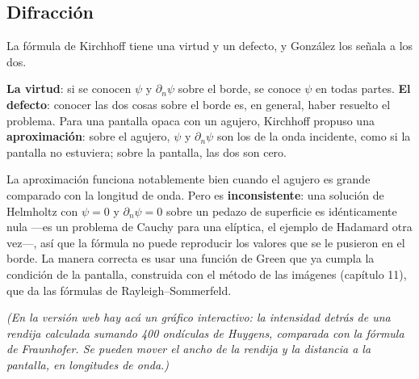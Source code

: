 \documentclass[
  spanish,
  a4paper,
]{scrbook}
\theoremstyle{definition}
\theoremstyle{plain}
\theoremstyle{definition}
\theoremstyle{plain}
\theoremstyle{definition}
\theoremstyle{remark}
\begin{document}
\subsection{Difracción}\label{sec-hip-difraccion}

La fórmula de Kirchhoff tiene una virtud y un defecto, y González los
señala a los dos.

\textbf{La virtud}: si se conocen \(\psi\) y \(\partial_n\psi\) sobre el
borde, se conoce \(\psi\) en todas partes. \textbf{El defecto}: conocer
las dos cosas sobre el borde es, en general, haber resuelto el problema.
Para una pantalla opaca con un agujero, Kirchhoff propuso una
\textbf{aproximación}: sobre el agujero, \(\psi\) y \(\partial_n\psi\)
son los de la onda incidente, como si la pantalla no estuviera; sobre la
pantalla, las dos son cero.

La aproximación funciona notablemente bien cuando el agujero es grande
comparado con la longitud de onda. Pero es \textbf{inconsistente}: una
solución de Helmholtz con \(\psi = 0\) y \(\partial_n\psi=0\) sobre un
pedazo de superficie es idénticamente nula ---es un problema de Cauchy
para una elíptica, el ejemplo de Hadamard otra vez---, así que la
fórmula no puede reproducir los valores que se le pusieron en el borde.
La manera correcta es usar una función de Green que ya cumpla la
condición de la pantalla, construida con el método de las imágenes
(capítulo 11), que da las fórmulas de Rayleigh--Sommerfeld.

\emph{(En la versión web hay acá un gráfico interactivo: la intensidad
detrás de una rendija calculada sumando 400 ondículas de Huygens,
comparada con la fórmula de Fraunhofer. Se pueden mover el ancho de la
rendija y la distancia a la pantalla, en longitudes de onda.)}
\end{document}
